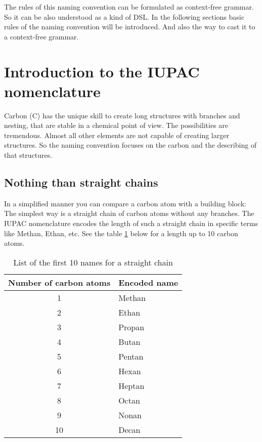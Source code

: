 \documentclass[a4paper,10pt]{article}
\newcommand{\gerquot}[1]{\glqq#1\grqq}
\newcommand{\dashAndSpace}{\textendash \space}
\newcommand{\CFG}{context-free grammar}
\newcommand{\captionVSpace}{\vspace*{-0.05cm}}
\begin{document}
The rules of this naming convention can be formulated as \CFG. So it can be also understood as a kind of DSL. In the following sections basic rules of the naming convention will be introduced. And also the way to cast it to a \CFG.





\section{Introduction to the IUPAC nomenclature}\label{s:IntroductionToTheIUPACNomenclature}
Carbon (C) has the unique skill to create long structures with branches and nesting, that are stable \dashAndSpace in a chemical point of view. The possibilities are tremendous. Almost all other elements are not capable of creating larger structures. So the naming convention focuses on the carbon and the describing of that structures.



\subsection{Nothing than straight chains}\label{ss:NothingThanStraightChains}
In a simplified manner you can compare a carbon atom with a building block: The simplest way is a straight chain of carbon atoms without any branches. The IUPAC nomenclature encodes the length of such a straight chain in specific terms like \gerquot{Methan}, \gerquot{Ethan}, etc. See the table \ref{tab:NumCarbonEncodedName} below for a length up to 10 carbon atoms.

\begin{table}[H]
    \centering
    \begin{tabular}{c|l}
        \toprule
        \textbf{Number of carbon atoms} & \textbf{Encoded name} \\
        \midrule
        1 & Methan \\
        2 & Ethan \\
        3 & Propan \\
        4 & Butan \\
        5 & Pentan \\
        6 & Hexan \\
        7 & Heptan \\
        8 & Octan \\
        9 & Nonan \\
        10 & Decan \\
        \bottomrule
    \end{tabular}
    \captionVSpace
    \caption{List of the first 10 names for a straight chain}
    \label{tab:NumCarbonEncodedName}
\end{table}
\end{document}
